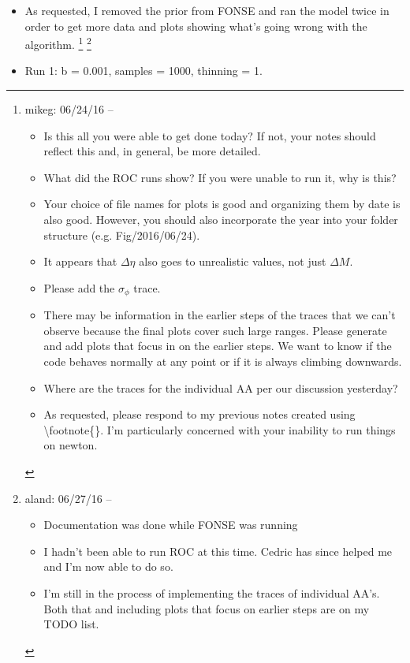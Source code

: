 \documentclass[11pt]{labbook}
\newcommand{\DeltaEta}{\ensuremath{\Delta\eta}\xspace}
\newcommand{\DeltaM}{\ensuremath{\Delta M}\xspace}
\begin{document}
    \begin{itemize}
        \item As requested, I removed the prior from FONSE and ran the model twice in order to get more data and plots showing what's going wrong with the algorithm.
\footnote{mikeg: 06/24/16 -- 
  \begin{itemize}
  \item Is this all you were able to get done today?  If not, your notes should reflect this and, in general, be more detailed.
  \item What did the ROC runs show?  If you were unable to run it, why is this?
  \item Your choice of file names for plots is good and organizing them by date is also good. 
    However, you should also incorporate the year into your folder structure (e.g. Fig/2016/06/24).
  \item It appears that \DeltaEta also goes to unrealistic values, not just \DeltaM.
  \item Please add the $\sigma_\phi$ trace.
  \item There may be information in the earlier steps of the traces that we can't observe because the final plots cover such large ranges. 
    Please generate and add plots that focus in on the earlier steps.
    We want to know if the code behaves normally at any point or if it is always climbing downwards.
  \item Where are the traces for the individual AA per our discussion yesterday?
  \item As requested, please respond to my previous notes created using \textbackslash footnote\{\}.
    I'm particularly concerned with your inability to run things on newton.
  \end{itemize}
}
\footnote{aland: 06/27/16 --
    \begin{itemize}
        \item Documentation was done while FONSE was running
        \item I hadn't been able to run ROC at this time. Cedric has since helped me and I'm now able to do so.
        \item I'm still in the process of implementing the traces of individual AA's. Both that and including plots that focus on earlier steps are on my TODO list.
    \end{itemize}
}
    \item Run 1: b = 0.001, samples = 1000, thinning = 1.
        

\end{itemize}
\end{document}
